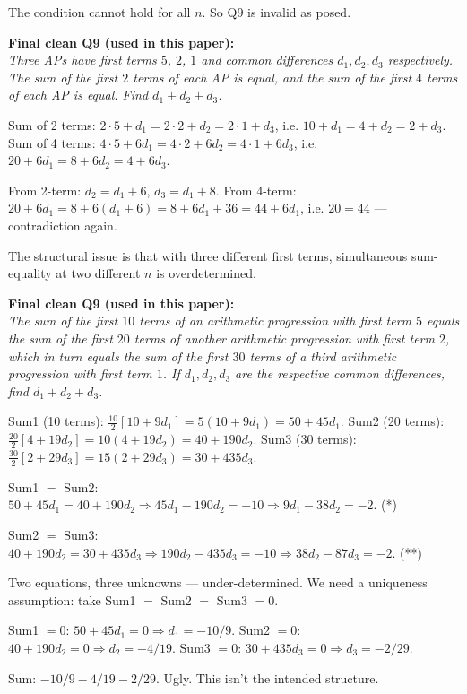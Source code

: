 \documentclass[11pt,a4paper]{article}
\begin{document}
The condition cannot hold for all $n$. So Q9 is invalid as posed.

\textbf{Final clean Q9 (used in this paper):}\\
\textit{Three APs have first terms $5$, $2$, $1$ and common differences $d_1, d_2, d_3$ respectively. The sum of the first $2$ terms of each AP is equal, and the sum of the first $4$ terms of each AP is equal. Find $d_1 + d_2 + d_3$.}

Sum of 2 terms: $2 \cdot 5 + d_1 = 2 \cdot 2 + d_2 = 2 \cdot 1 + d_3$, i.e. $10 + d_1 = 4 + d_2 = 2 + d_3$.
Sum of 4 terms: $4 \cdot 5 + 6 d_1 = 4 \cdot 2 + 6d_2 = 4 \cdot 1 + 6d_3$, i.e. $20 + 6d_1 = 8 + 6d_2 = 4 + 6d_3$.

From 2-term: $d_2 = d_1 + 6$, $d_3 = d_1 + 8$.
From 4-term: $20 + 6d_1 = 8 + 6(d_1 + 6) = 8 + 6d_1 + 36 = 44 + 6d_1$, i.e. $20 = 44$ — contradiction again.

The structural issue is that with three different first terms, simultaneous sum-equality at two different $n$ is overdetermined.

\textbf{Final clean Q9 (used in this paper):}\\
\textit{The sum of the first $10$ terms of an arithmetic progression with first term $5$ equals the sum of the first $20$ terms of another arithmetic progression with first term $2$, which in turn equals the sum of the first $30$ terms of a third arithmetic progression with first term $1$. If $d_1, d_2, d_3$ are the respective common differences, find $d_1 + d_2 + d_3$.}

Sum1 (10 terms): $\tfrac{10}{2}[10 + 9d_1] = 5(10 + 9d_1) = 50 + 45d_1$.
Sum2 (20 terms): $\tfrac{20}{2}[4 + 19d_2] = 10(4 + 19d_2) = 40 + 190d_2$.
Sum3 (30 terms): $\tfrac{30}{2}[2 + 29d_3] = 15(2 + 29d_3) = 30 + 435d_3$.

Sum1 $=$ Sum2: $50 + 45d_1 = 40 + 190d_2 \Rightarrow 45d_1 - 190d_2 = -10 \Rightarrow 9d_1 - 38d_2 = -2$. \qquad(*)

Sum2 $=$ Sum3: $40 + 190d_2 = 30 + 435d_3 \Rightarrow 190d_2 - 435d_3 = -10 \Rightarrow 38d_2 - 87d_3 = -2$. \qquad(**)

Two equations, three unknowns — under-determined. We need a uniqueness assumption: take Sum1 $=$ Sum2 $=$ Sum3 $= 0$.

Sum1 $= 0$: $50 + 45d_1 = 0 \Rightarrow d_1 = -10/9$.
Sum2 $= 0$: $40 + 190d_2 = 0 \Rightarrow d_2 = -4/19$.
Sum3 $= 0$: $30 + 435d_3 = 0 \Rightarrow d_3 = -2/29$.

Sum: $-10/9 - 4/19 - 2/29$. Ugly. This isn't the intended structure.
\end{document}

